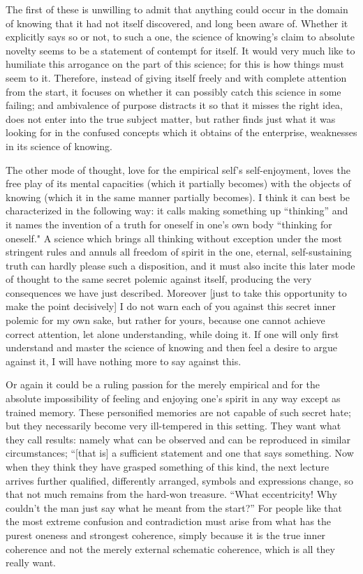 The first of these is unwilling to admit
that anything could occur in the domain of knowing
that it had not itself discovered,
and long been aware of.
Whether it explicitly says so or not, to such a one,
the science of knowing's claim to absolute novelty
seems to be a statement of contempt for itself.
It would very much like to humiliate
this arrogance on the part of this science;
for this is how things must seem to it.
Therefore, instead of giving itself freely
and with complete attention from the start,
it focuses on whether it can possibly catch
this science in some failing;
and ambivalence of purpose distracts it
so that it misses the right idea,
does not enter into the true subject matter,
but rather finds just what it was looking for
in the confused concepts
which it obtains of the enterprise,
weaknesses in its science of knowing.

The other mode of thought,
love for the empirical self's self-enjoyment,
loves the free play of its mental capacities
(which it partially becomes)
with the objects of knowing
(which it in the same manner partially becomes).
I think it can best be characterized in the following way:
it calls making something up “thinking”
and it names the invention of a truth
for oneself in one's own body
“thinking for oneself."
A science which brings all
thinking without exception
under the most stringent rules
and annuls all freedom of spirit
in the one, eternal, self-sustaining truth
can hardly please such a disposition,
and it must also incite this later
mode of thought to the same
secret polemic against itself,
producing the very consequences we have just described.
Moreover [just to take this opportunity
to make the point decisively]
I do not warn each of you against
this secret inner polemic for my own sake,
but rather for yours,
because one cannot achieve correct attention,
let alone understanding,
while doing it.
If one will only first understand
and master the science of knowing
and then feel a desire to argue against it,
I will have nothing more to say against this.

Or again it could be a ruling passion
for the merely empirical
and for the absolute impossibility of
feeling and enjoying one's spirit in any way
except as trained memory.
These personified memories are not capable of such secret hate;
but they necessarily become very ill-tempered in this setting.
They want what they call results:
namely what can be observed and
can be reproduced in similar circumstances;
“[that is] a sufficient statement and one that says something.
Now when they think they have grasped something of this kind,
the next lecture arrives further qualified,
differently arranged, symbols and expressions change,
so that not much remains from the hard-won treasure.
“What eccentricity! Why couldn't the man
just say what he meant from the start?”
For people like that the most extreme confusion and contradiction
must arise from what has the purest oneness and strongest coherence,
simply because it is the true inner coherence
and not the merely external schematic coherence,
which is all they really want.

